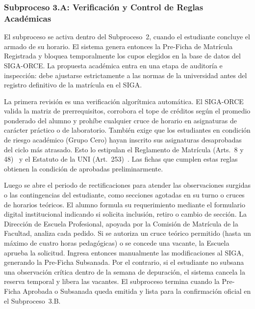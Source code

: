 \subsubsection{Subproceso 3.A: Verificaci\'on y Control de Reglas Acad\'emicas}

El subproceso se activa dentro del Subproceso~2, cuando el estudiante concluye el armado de su horario. El sistema genera entonces la Pre-Ficha de Matr\'icula Registrada y bloquea temporalmente los cupos elegidos en la base de datos del SIGA-ORCE. La propuesta acad\'emica entra en una etapa de auditor\'ia e inspecci\'on: debe ajustarse estrictamente a las normas de la universidad antes del registro definitivo de la matr\'icula en el SIGA.

La primera revisi\'on es una verificaci\'on algor\'itmica autom\'atica. El SIGA-ORCE valida la matriz de prerrequisitos, corrobora el tope de cr\'editos seg\'un el promedio ponderado del alumno y proh\'ibe cualquier cruce de horario en asignaturas de car\'acter pr\'actico o de laboratorio. Tambi\'en exige que los estudiantes en condici\'on de riesgo acad\'emico (Grupo Cero) hayan inscrito sus asignaturas desaprobadas del ciclo m\'as atrasado. Esto lo estipulan el Reglamento de Matr\'icula (Arts.~8\textdegree{} y 48\textdegree{})~\cite{reglamento2022} y el Estatuto de la UNI (Art.~253\textdegree{})~\cite{ley30220}. Las fichas que cumplen estas reglas obtienen la condici\'on de aprobadas preliminarmente.

Luego se abre el periodo de rectificaciones para atender las observaciones surgidas o las contingencias del estudiante, como secciones agotadas en su turno o cruces de horarios te\'oricos. El alumno formula su requerimiento mediante el formulario digital institucional indicando si solicita inclusi\'on, retiro o cambio de secci\'on. La Direcci\'on de Escuela Profesional, apoyada por la Comisi\'on de Matr\'icula de la Facultad, analiza cada pedido. Si se autoriza un cruce te\'orico permitido (hasta un m\'aximo de cuatro horas pedag\'ogicas) o se concede una vacante, la Escuela aprueba la solicitud. Ingresa entonces manualmente las modificaciones al SIGA, generando la Pre-Ficha Subsanada. Por el contrario, si el estudiante no subsana una observaci\'on cr\'itica dentro de la semana de depuraci\'on, el sistema cancela la reserva temporal y libera las vacantes. El subproceso termina cuando la Pre-Ficha Aprobada o Subsanada queda emitida y lista para la confirmaci\'on oficial en el Subproceso~3.B.

